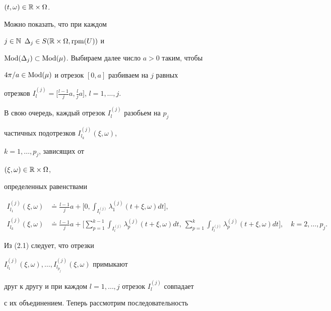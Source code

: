$(t,\omega)\in\Bbb R\times\Omega$.


Можно показать, что при каждом


$j\in\Bbb N$\; $\Delta_j\in S(\Bbb R\times\Omega,\operatorname{rpm}(U))$ и


$\operatorname{Mod}(\Delta_j)\subset\operatorname{Mod}(\mu)$. Выбираем далее число $a>0$ таким, чтобы


$4\pi/a\in\operatorname{Mod}(\mu)$ и отрезок $[0,a]$ разбиваем на $j$ равных


отрезков $I_l^{(j)}=\big[\frac{l-1}{j}a,\frac{l}{j}a\big]$, $l=1,\dotsc,j$.


В свою очередь, каждый отрезок $I_l^{(j)}$ разобьем на $p_j$


частичных подотрезков $I_{l_k}^{(j)}(\xi,\omega)$,


$k=1,\dotsc,p_j$, зависящих от


$(\xi,\omega)\in \Bbb R\times\Omega$,


определенных равенствами


\begin{equation}


\begin{split}


I_{l_1}^{(j)}(\xi,\omega) &\doteq


\frac{l-1}{j}a+\bigg[0,\int_{I_l^{(j)}}\lambda_1^{(j)}(t+\xi,


\omega)dt\bigg],\\


%


I_{l_k}^{(j)}(\xi,\omega) &\doteq


\frac{l-1}{j}a+\bigg[\sum\limits_{p=1}^{k-1}


\int_{I_l^{(j)}}\lambda_p^{(j)}(t+\xi,\omega)dt,\


\sum\limits_{p=1}^{k}


\int_{I_l^{(j)}}\lambda_p^{(j)}(t+\xi,\omega)dt\bigg],\quad k=2,\dotsc,p_j.


\end{split}


\tag{2.1}


\end{equation}


Из (2.1) следует, что отрезки


$I_{l_1}^{(j)}(\xi,\omega),\dotsc,I_{l_{p_j}}^{(j)}(\xi,\omega)$ примыкают


друг к другу и при каждом $l=1,\dotsc,j$ отрезок $I_l^{(j)}$ совпадает


с их объединением. Теперь рассмотрим последовательность


